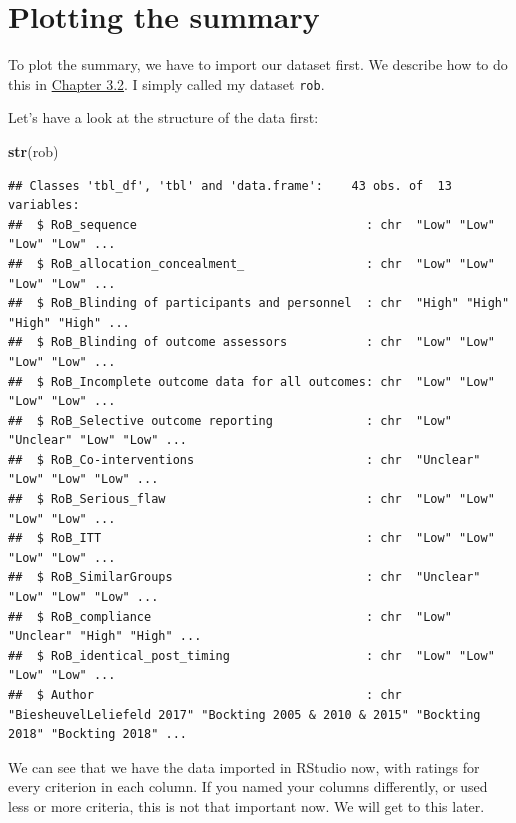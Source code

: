 \documentclass[]{book}
\newenvironment{Shaded}{\begin{snugshade}}{\end{snugshade}}
\newcommand{\KeywordTok}[1]{\textcolor[rgb]{0.13,0.29,0.53}{\textbf{#1}}}
\newcommand{\NormalTok}[1]{#1}
\begin{document}
\hypertarget{plotting-the-summary}{%
\section{Plotting the summary}\label{plotting-the-summary}}

To plot the summary, we have to import our dataset first. We describe how to do this in \protect\hyperlink{import_excel}{Chapter 3.2}. I simply called my dataset \texttt{rob}.

Let's have a look at the structure of the data first:

\begin{Shaded}
\begin{Highlighting}[]
\KeywordTok{str}\NormalTok{(rob)}
\end{Highlighting}
\end{Shaded}

\begin{verbatim}
## Classes 'tbl_df', 'tbl' and 'data.frame':    43 obs. of  13 variables:
##  $ RoB_sequence                                : chr  "Low" "Low" "Low" "Low" ...
##  $ RoB_allocation_concealment_                 : chr  "Low" "Low" "Low" "Low" ...
##  $ RoB_Blinding of participants and personnel  : chr  "High" "High" "High" "High" ...
##  $ RoB_Blinding of outcome assessors           : chr  "Low" "Low" "Low" "Low" ...
##  $ RoB_Incomplete outcome data for all outcomes: chr  "Low" "Low" "Low" "Low" ...
##  $ RoB_Selective outcome reporting             : chr  "Low" "Unclear" "Low" "Low" ...
##  $ RoB_Co-interventions                        : chr  "Unclear" "Low" "Low" "Low" ...
##  $ RoB_Serious_flaw                            : chr  "Low" "Low" "Low" "Low" ...
##  $ RoB_ITT                                     : chr  "Low" "Low" "Low" "Low" ...
##  $ RoB_SimilarGroups                           : chr  "Unclear" "Low" "Low" "Low" ...
##  $ RoB_compliance                              : chr  "Low" "Unclear" "High" "High" ...
##  $ RoB_identical_post_timing                   : chr  "Low" "Low" "Low" "Low" ...
##  $ Author                                      : chr  "BiesheuvelLeliefeld 2017" "Bockting 2005 & 2010 & 2015" "Bockting 2018" "Bockting 2018" ...
\end{verbatim}

We can see that we have the data imported in RStudio now, with ratings for every criterion in each column. If you named your columns differently, or used less or more criteria, this is not that important now. We will get to this later.
\end{document}
